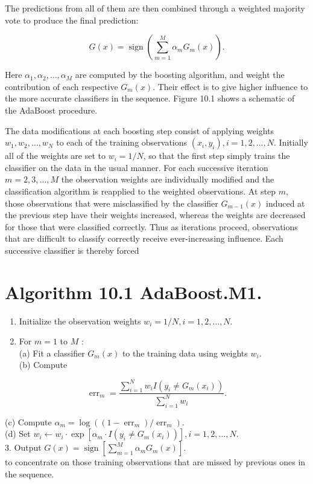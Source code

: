 \documentclass[10pt]{article}
\begin{document}
The predictions from all of them are then combined through a weighted majority vote to produce the final prediction:


\begin{equation*}
G(x)=\operatorname{sign}\left(\sum_{m=1}^{M} \alpha_{m} G_{m}(x)\right) . \tag{10.1}
\end{equation*}


Here $\alpha_{1}, \alpha_{2}, \ldots, \alpha_{M}$ are computed by the boosting algorithm, and weight the contribution of each respective $G_{m}(x)$. Their effect is to give higher influence to the more accurate classifiers in the sequence. Figure 10.1 shows a schematic of the AdaBoost procedure.

The data modifications at each boosting step consist of applying weights $w_{1}, w_{2}, \ldots, w_{N}$ to each of the training observations $\left(x_{i}, y_{i}\right), i=1,2, \ldots, N$. Initially all of the weights are set to $w_{i}=1 / N$, so that the first step simply trains the classifier on the data in the usual manner. For each successive iteration $m=2,3, \ldots, M$ the observation weights are individually modified and the classification algorithm is reapplied to the weighted observations. At step $m$, those observations that were misclassified by the classifier $G_{m-1}(x)$ induced at the previous step have their weights increased, whereas the weights are decreased for those that were classified correctly. Thus as iterations proceed, observations that are difficult to classify correctly receive ever-increasing influence. Each successive classifier is thereby forced

\section*{Algorithm 10.1 AdaBoost.M1.}
\begin{enumerate}
  \item Initialize the observation weights $w_{i}=1 / N, i=1,2, \ldots, N$.
  \item For $m=1$ to $M$ :\\
(a) Fit a classifier $G_{m}(x)$ to the training data using weights $w_{i}$.\\
(b) Compute
\end{enumerate}

$$
\operatorname{err}_{m}=\frac{\sum_{i=1}^{N} w_{i} I\left(y_{i} \neq G_{m}\left(x_{i}\right)\right)}{\sum_{i=1}^{N} w_{i}} .
$$

(c) Compute $\alpha_{m}=\log \left(\left(1-\operatorname{err}_{m}\right) / \operatorname{err}_{m}\right)$.\\
(d) Set $w_{i} \leftarrow w_{i} \cdot \exp \left[\alpha_{m} \cdot I\left(y_{i} \neq G_{m}\left(x_{i}\right)\right)\right], i=1,2, \ldots, N$.\\
3. Output $G(x)=\operatorname{sign}\left[\sum_{m=1}^{M} \alpha_{m} G_{m}(x)\right]$.\\
to concentrate on those training observations that are missed by previous ones in the sequence.
\end{document}
